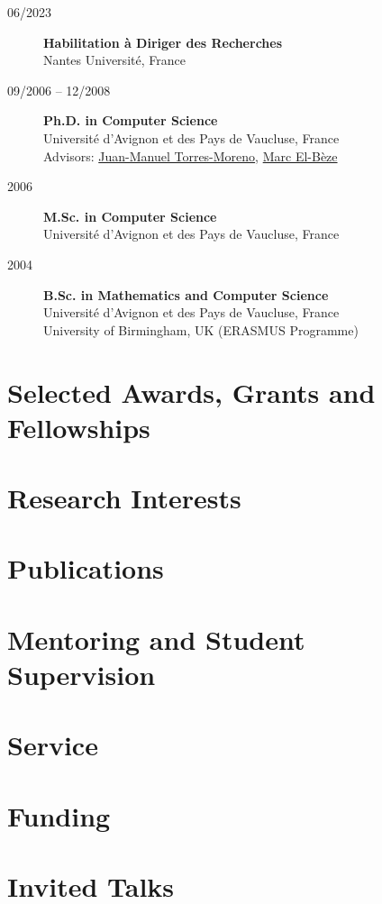 \documentclass[11pt,a4paper]{article}
\begin{document}
\begin{description}

    \item[06/2023] \textbf{Habilitation à Diriger des Recherches} \\
                    Nantes Université, France

    \item[09/2006 -- 12/2008] \textbf{Ph.D. in Computer Science} \\
                                Université d'Avignon et des Pays de Vaucluse, France \\
                                Advisors: 
                                \href{http://lia.univ-avignon.fr/chercheurs/torres/}{Juan-Manuel Torres-Moreno},
                                \href{http://lia.univ-avignon.fr/user/48}{Marc El-Bèze}
                                
    \item[2006] \textbf{M.Sc. in Computer Science} \\
                Université d'Avignon et des Pays de Vaucluse, France

    \item[2004] \textbf{B.Sc. in Mathematics and Computer Science} \\
                Université d'Avignon et des Pays de Vaucluse, France \\
                University of Birmingham, UK (ERASMUS Programme)
    
\end{description}

\section*{Selected Awards, Grants and Fellowships}


\section{Research Interests}


\section{Publications}


\section*{Mentoring and Student Supervision}


\section*{Service}


\section*{Funding}


\section*{Invited Talks}

\end{document}
